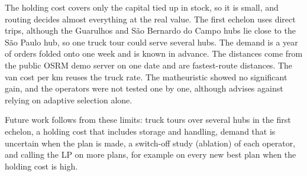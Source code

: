 \documentclass[11pt,a4paper]{article}
\begin{document}
The holding cost covers only the capital tied up in stock, so it
is small, and routing decides almost everything at the real value. The first echelon uses direct
trips, although the Guarulhos and S\~ao Bernardo do Campo hubs lie close to the S\~ao Paulo hub, so
one truck tour could serve several hubs. The demand is a year of orders folded onto one week and
is known in advance. The distances come from the public OSRM demo server on one date and are
fastest-route distances. The van cost per km reuses the truck rate. The matheuristic showed no
significant gain, and the operators were not tested one by one, although \citet{voigt2025review}
advises against relying on adaptive selection alone.

Future work follows from these limits: truck tours over several hubs in the first echelon, a
holding cost that includes storage and handling, demand that is uncertain when the plan is made, a
switch-off study (ablation) of each operator, and calling the LP on more plans, for example on
every new best plan when the holding cost is high.



\end{document}
